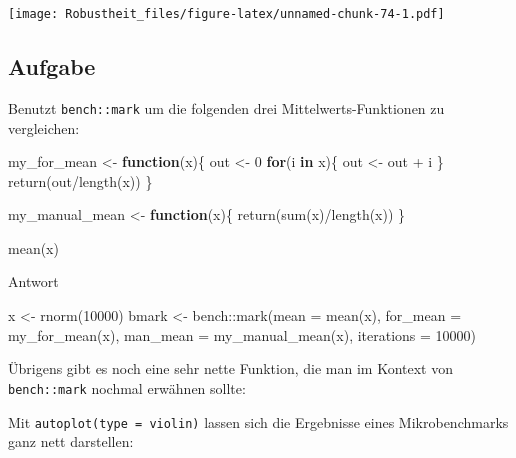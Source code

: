 \documentclass[
]{book}
\newenvironment{Shaded}{\begin{snugshade}}{\end{snugshade}}
\newcommand{\AttributeTok}[1]{\textcolor[rgb]{0.77,0.63,0.00}{#1}}
\newcommand{\ControlFlowTok}[1]{\textcolor[rgb]{0.13,0.29,0.53}{\textbf{#1}}}
\newcommand{\DecValTok}[1]{\textcolor[rgb]{0.00,0.00,0.81}{#1}}
\newcommand{\FunctionTok}[1]{\textcolor[rgb]{0.00,0.00,0.00}{#1}}
\newcommand{\NormalTok}[1]{#1}
\newcommand{\OtherTok}[1]{\textcolor[rgb]{0.56,0.35,0.01}{#1}}
\newcommand{\SpecialCharTok}[1]{\textcolor[rgb]{0.00,0.00,0.00}{#1}}
\begin{document}
\texttt{[image: Robustheit\_files/figure-latex/unnamed-chunk-74-1.pdf]}

\hypertarget{aufgabe-10}{%
\subsection{Aufgabe}\label{aufgabe-10}}

Benutzt \texttt{bench::mark} um die folgenden drei Mittelwerts-Funktionen zu vergleichen:

\begin{Shaded}
\begin{Highlighting}[]
\NormalTok{my\_for\_mean }\OtherTok{\textless{}{-}} \ControlFlowTok{function}\NormalTok{(x)\{}
\NormalTok{  out }\OtherTok{\textless{}{-}} \DecValTok{0}
  \ControlFlowTok{for}\NormalTok{(i }\ControlFlowTok{in}\NormalTok{ x)\{}
\NormalTok{    out }\OtherTok{\textless{}{-}}\NormalTok{ out }\SpecialCharTok{+}\NormalTok{ i}
\NormalTok{  \}}
  \FunctionTok{return}\NormalTok{(out}\SpecialCharTok{/}\FunctionTok{length}\NormalTok{(x))}
\NormalTok{\}}

\NormalTok{my\_manual\_mean }\OtherTok{\textless{}{-}} \ControlFlowTok{function}\NormalTok{(x)\{}
  \FunctionTok{return}\NormalTok{(}\FunctionTok{sum}\NormalTok{(x)}\SpecialCharTok{/}\FunctionTok{length}\NormalTok{(x))}
\NormalTok{\}}

\FunctionTok{mean}\NormalTok{(x)}
\end{Highlighting}
\end{Shaded}

Antwort

\begin{Shaded}
\begin{Highlighting}[]
\NormalTok{x }\OtherTok{\textless{}{-}} \FunctionTok{rnorm}\NormalTok{(}\DecValTok{10000}\NormalTok{)}
\NormalTok{bmark }\OtherTok{\textless{}{-}}\NormalTok{ bench}\SpecialCharTok{::}\FunctionTok{mark}\NormalTok{(}\AttributeTok{mean =} \FunctionTok{mean}\NormalTok{(x),}
             \AttributeTok{for\_mean =} \FunctionTok{my\_for\_mean}\NormalTok{(x),}
             \AttributeTok{man\_mean =} \FunctionTok{my\_manual\_mean}\NormalTok{(x),}
            \AttributeTok{iterations =} \DecValTok{10000}\NormalTok{)}
\end{Highlighting}
\end{Shaded}

Übrigens gibt es noch eine sehr nette Funktion, die man im Kontext von \texttt{bench::mark} nochmal erwähnen sollte:

Mit \texttt{autoplot(type\ =\ \textquotesingle{}violin\textquotesingle{})} lassen sich die Ergebnisse eines Mikrobenchmarks ganz nett darstellen:
\end{document}
